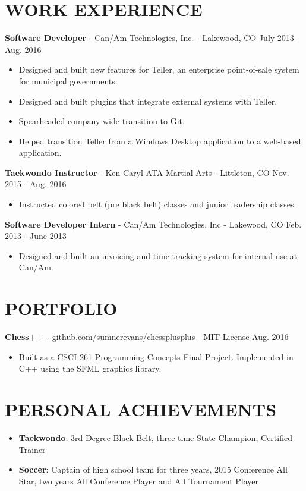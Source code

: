 \documentclass[10.5pt,letterpaper]{article}
\begin{document}
\section*{WORK EXPERIENCE}
\textbf{Software Developer} - Can/Am Technologies, Inc. - Lakewood, CO \hfill July 2013 - Aug. 2016
\begin{itemize}
    \item Designed and built new features for Teller, an enterprise point-of-sale system for
        municipal governments.
    \item Designed and built plugins that integrate external systems with Teller.
    \item Spearheaded company-wide transition to Git.
    \item Helped transition Teller from a Windows Desktop application to a web-based application.
\end{itemize}

\vspace{4pt}
\textbf{Taekwondo Instructor} - Ken Caryl ATA Martial Arts - Littleton, CO \hfill
Nov. 2015 - Aug. 2016
\begin{itemize}
    \item Instructed colored belt (pre black belt) classes and junior leadership classes.
\end{itemize}

\vspace{4pt}
\textbf{Software Developer Intern} - Can/Am Technologies, Inc - Lakewood, CO \hfill
Feb. 2013 - June 2013
\begin{itemize}
    \item Designed and built an invoicing and time tracking system for internal use at Can/Am.
\end{itemize}

\section*{PORTFOLIO}
\textbf{Chess++} -
\href{https://github.com/sumnerevans/chessplusplus}{github.com/sumnerevans/chessplusplus} - MIT
License \hfill Aug. 2016
\begin{itemize}
    \item Built as a CSCI 261 Programming Concepts Final Project. Implemented in C++ using the SFML
        graphics library.
\end{itemize}

\section*{PERSONAL ACHIEVEMENTS}
\begin{itemize}
    \item \textbf{Taekwondo}: 3rd Degree Black Belt, three time State Champion, Certified Trainer
    \item \textbf{Soccer}: Captain of high school team for three years, 2015 Conference All Star,
        two years All Conference Player and All Tournament Player
\end{itemize}
\end{document}

